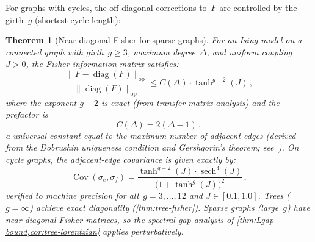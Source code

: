 \documentclass[11pt]{article}
\newtheorem{theorem}{Theorem}[section]
\theoremstyle{definition}
\theoremstyle{remark}
\begin{document}
For graphs with cycles, the off-diagonal corrections to~$F$ are
controlled by the girth~$g$ (shortest cycle length):

\begin{theorem}[Near-diagonal Fisher for sparse graphs]
\label{thm:near-diagonal-fisher}
For an Ising model on a connected graph with girth~$g \geq 3$,
maximum degree~$\Delta$, and uniform coupling~$J > 0$, the Fisher
information matrix satisfies:
\begin{equation}
\label{eq:near-diagonal-bound}
\frac{\|F - \operatorname{diag}(F)\|_{\text{op}}}
     {\|\operatorname{diag}(F)\|_{\text{op}}}
\leq C(\Delta) \cdot \tanh^{g-2}(J)\,,
\end{equation}
where the exponent $g - 2$ is exact (from transfer matrix analysis)
and the prefactor is
\begin{equation}
\label{eq:C-derived}
C(\Delta) = 2(\Delta - 1)\,,
\end{equation}
a universal constant equal to the maximum number of adjacent edges
(derived from the Dobrushin uniqueness condition and Gershgorin's
theorem; see~\cite{Dobrushin1985}).
On cycle graphs, the adjacent-edge covariance is given exactly by:
\begin{equation}
\label{eq:adjacent-edge-cov}
\operatorname{Cov}(\sigma_e, \sigma_f)
= \frac{\tanh^{g-2}(J) \cdot \operatorname{sech}^4(J)}
       {\bigl(1 + \tanh^g(J)\bigr)^2}\,,
\end{equation}
verified to machine precision for all~$g = 3, \ldots, 12$ and
$J \in [0.1, 1.0]$.
Trees ($g = \infty$) achieve exact diagonality
(\cref{thm:tree-fisher}).
Sparse graphs (large~$g$) have near-diagonal Fisher matrices, so the
spectral gap analysis of
\cref{thm:Lgap-bound,cor:tree-lorentzian} applies perturbatively.
\end{theorem}
\end{document}
